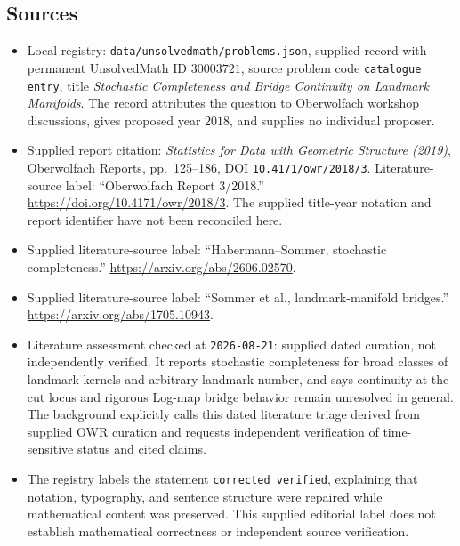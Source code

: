 \documentclass[11pt]{article}
\begin{document}
\subsection{Sources}
\begin{itemize}
\item Local registry: \texttt{data/unsolvedmath/problems.json}, supplied record with permanent UnsolvedMath ID \(30003721\), source problem code \texttt{catalogue entry}, title \emph{Stochastic Completeness and Bridge Continuity on Landmark Manifolds}. The record attributes the question to Oberwolfach workshop discussions, gives proposed year \(2018\), and supplies no individual proposer.
\item Supplied report citation: \emph{Statistics for Data with Geometric Structure (2019)}, Oberwolfach Reports, pp.~125--186, DOI \texttt{10.4171/owr/2018/3}. Literature-source label: ``Oberwolfach Report 3/2018.'' \url{https://doi.org/10.4171/owr/2018/3}. The supplied title-year notation and report identifier have not been reconciled here.
\item Supplied literature-source label: ``Habermann--Sommer, stochastic completeness.'' \url{https://arxiv.org/abs/2606.02570}.
\item Supplied literature-source label: ``Sommer et al., landmark-manifold bridges.'' \url{https://arxiv.org/abs/1705.10943}.
\item Literature assessment checked at \texttt{2026-08-21}: supplied dated curation, not independently verified. It reports stochastic completeness for broad classes of landmark kernels and arbitrary landmark number, and says continuity at the cut locus and rigorous Log-map bridge behavior remain unresolved in general. The background explicitly calls this dated literature triage derived from supplied OWR curation and requests independent verification of time-sensitive status and cited claims.
\item The registry labels the statement \texttt{corrected\_verified}, explaining that notation, typography, and sentence structure were repaired while mathematical content was preserved. This supplied editorial label does not establish mathematical correctness or independent source verification.
\end{itemize}
\end{document}
